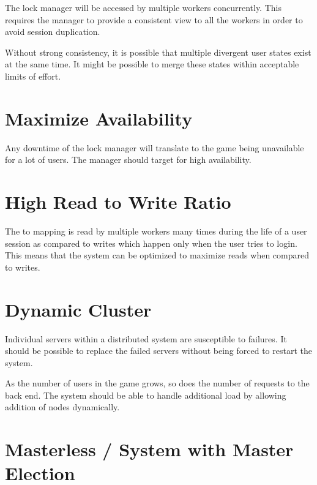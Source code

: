 The lock manager will be accessed by multiple workers concurrently. This
requires the manager to provide a consistent view to all the workers in
order to avoid session duplication.

Without strong consistency, it is possible that multiple divergent user states
exist at the same time. It might be possible to merge these states within
acceptable limits of effort.

\section{Maximize Availability}


Any downtime of the lock manager will translate to the game being unavailable
for a lot of users. The manager should target for high availability.

\section{High Read to Write Ratio}
\label{section:req.read.write.ratio}


The  to  mapping is read by multiple workers many times
during the life
of a user session as compared to writes which happen only when the user tries
to login. This means that the system can be optimized to maximize reads when
compared to writes.

\section{Dynamic Cluster}
\label{section:req.dynamic.cluster}


Individual servers within a distributed system are susceptible to failures.
It should be possible to replace the failed servers without being forced
to restart the system.

As the number of users in the game grows, so does the number of requests to
the back end. The system should be able to handle additional load by allowing
addition of nodes dynamically.


\section{Masterless / System with Master Election}

